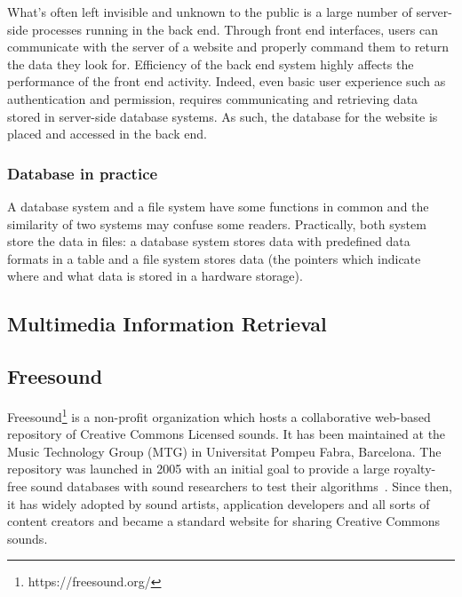 What's often left invisible and unknown to the public is a large number of server-side processes running in the back end. Through front end interfaces, users can communicate with the server of a website and properly command them to return the data they look for. Efficiency of the back end system highly affects the performance of the front end activity. Indeed, even basic user experience such as authentication and permission, requires communicating and retrieving data stored in server-side database systems. As such, the database for the website is placed and accessed in the back end.

\subsubsection{Database in practice}
A database system and a file system have some functions in common and the similarity of two systems may confuse some readers. Practically, both system store the data in files: a database system stores data with predefined data formats in a table and a file system stores data (the pointers which indicate where and what data is stored in a hardware storage).






\subsection{Multimedia Information Retrieval}
\label{sec:mir}

\subsection{Freesound}
Freesound\footnote{https://freesound.org/} is a non-profit organization which hosts a collaborative web-based repository of Creative Commons Licensed sounds. It has been maintained at the Music Technology Group (MTG) in Universitat Pompeu Fabra, Barcelona. The repository was launched in 2005 with an initial goal to provide a large royalty-free sound databases with sound researchers to test their algorithms~\cite{frederic2013}. Since then, it has widely adopted by sound artists, application developers and all sorts of content creators and became a standard website for sharing Creative Commons sounds.

